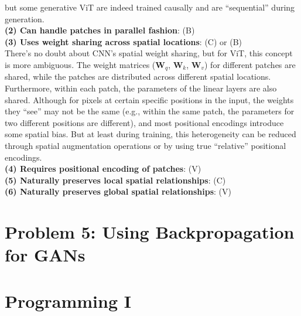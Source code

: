 \documentclass[11pt, a4paper, oneside]{memoir}
\begin{document}
\begin{enumerate}[itemsep=1em]
            but some generative ViT are indeed trained causally and are ``sequential'' during generation. \\
        \textbf{(2) Can handle patches in parallel fashion}: (B) \\
        \textbf{(3) Uses weight sharing across spatial locations}: (C) or (B) \\
            There's no doubt about CNN's spatial weight sharing, but for ViT, this concept is more ambiguous.
            The weight matrices ($\mathbf{W}_q$, $\mathbf{W}_k$, $\mathbf{W}_v$) for different patches are shared,
            while the patches are distributed across different spatial locations.
            Furthermore, within each patch, the parameters of the linear layers are also shared.
            Although for pixels at certain specific positions in the input,
            the weights they ``see'' may not be the same (e.g., within the same patch, the parameters for two different positions are different),
            and most positional encodings introduce some spatial bias. But at least during training, this heterogeneity can be reduced through spatial augmentation operations
            or by using true ``relative'' positional encodings. \\
        \textbf{(4) Requires positional encoding of patches}: (V) \\
        \textbf{(5) Naturally preserves local spatial relationships}: (C) \\
        \textbf{(6) Naturally preserves global spatial relationships}: (V) \\
\end{enumerate}

\chapter{Problem 5: Using Backpropagation for GANs}

\chapter{Programming I}
\end{document}
